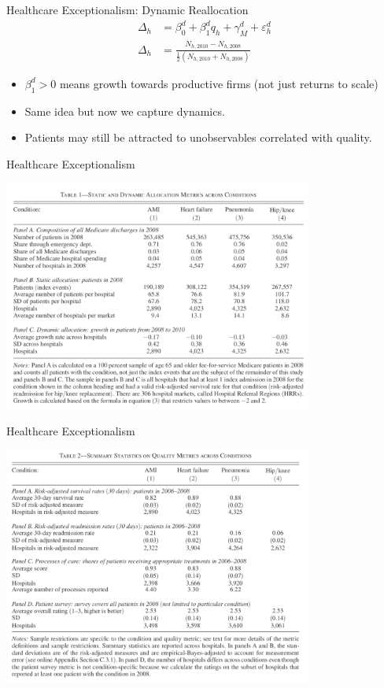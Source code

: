 \documentclass[aspectratio=169]{beamer}
\begin{document}
\begin{frame}{Healthcare Exceptionalism: Dynamic Reallocation}
\begin{align*}
\Delta_{h}&=\beta_{0}^{d}+\beta_{1}^{d} q_{h}+\gamma_{M}^{d}+\varepsilon_{h}^{d}\\
\Delta_{h}&=\frac{N_{h, 2010}-N_{h, 2008}}{\frac{1}{2}\left(N_{h, 2010}+N_{h, 2008}\right)}
\end{align*}
\begin{itemize}
\item $\beta_1^d>0$ means growth towards productive firms (not just returns to scale)
\item Same idea but now we capture \alert{dynamics}.
\item Patients may still be attracted to \alert{unobservables correlated with quality}.
\end{itemize}
\end{frame}


\begin{frame}{Healthcare Exceptionalism}
\begin{center}
\includegraphics[width=4in]{./resources/hc1.png}
\end{center}
\end{frame}

\begin{frame}{Healthcare Exceptionalism}
\begin{center}
\includegraphics[width=4in]{./resources/hc2.png}
\end{center}
\end{frame}
\end{document}
